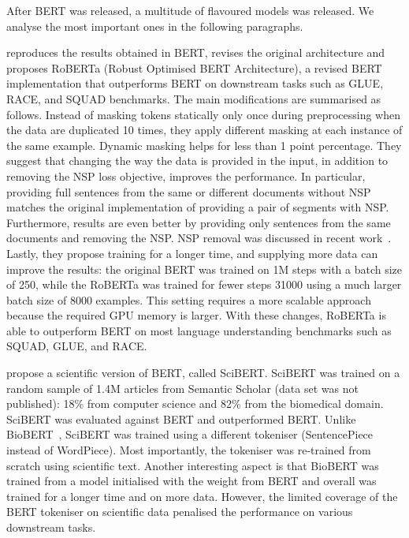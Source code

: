 After BERT was released, a multitude of flavoured models was released. We analyse the most important ones in the following paragraphs. 

\cite{liu2019roberta} reproduces the results obtained in BERT, revises the original architecture and proposes RoBERTa (Robust Optimised BERT Architecture), a revised BERT implementation that outperforms BERT on downstream tasks such as GLUE, RACE, and SQUAD benchmarks. 
The main modifications are summarised as follows. Instead of masking tokens statically only once during preprocessing when the data are duplicated 10 times, they apply different masking at each instance of the same example. Dynamic masking helps for less than 1 point percentage.
They suggest that changing the way the data is provided in the input, in addition to removing the NSP loss objective, improves the performance. 
In particular, providing full sentences from the same or different documents without NSP matches the original implementation of providing a pair of segments with NSP. 
Furthermore, results are even better by providing only sentences from the same documents and removing the NSP.
NSP removal was discussed in recent work~\cite{lample2019cross}.
Lastly, they propose training for a longer time, and supplying more data can improve the results: the original BERT was trained on 1M steps with a batch size of 250, while the RoBERTa was trained for fewer steps 31000 using a much larger batch size of 8000 examples. This setting requires a more scalable approach because the required GPU memory is larger. 
With these changes, RoBERTa is able to outperform BERT on most language understanding benchmarks such as SQUAD, GLUE, and RACE. 

\cite{Beltagy2019SciBERT} propose a scientific version of BERT, called SciBERT. 
SciBERT was trained on a random sample of 1.4M articles from Semantic Scholar (data set was not published): 18\% from computer science and 82\% from the biomedical domain. SciBERT was evaluated against BERT and outperformed BERT. 
Unlike BioBERT~\cite{lee2019biobert}, SciBERT was trained using a different tokeniser (SentencePiece instead of WordPiece). Most importantly, the tokeniser was re-trained from scratch using scientific text.
Another interesting aspect is that BioBERT was trained from a model initialised with the weight from BERT and overall was trained for a longer time and on more data. However, the limited coverage of the BERT tokeniser on scientific data penalised the performance on various downstream tasks.

